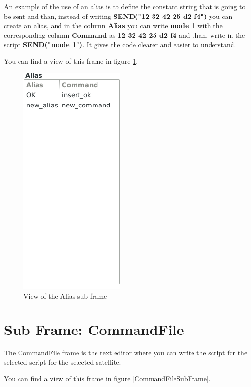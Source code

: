 \documentclass[pdftex,11pt,a4paper,titlepage]{report}
\begin{document}
An example of the use of an alias is to define the constant string that is going to be sent and than, instead of writing \textbf{SEND("12 32 42 25 d2 f4")} you can create an alias, and in the column \textbf{Alias} you can write \textbf{mode 1} with the corresponding column \textbf{Command} as \textbf{12 32 42 25 d2 f4} and than, write in the script \textbf{SEND("mode 1")}. It gives the code clearer and easier to understand. 

You can find a view of this frame in figure \ref{AliasSubFrame}.
\begin{figure}[h]
\centering
\includegraphics[scale=0.6]{../images/AliasSubFrame.png}
\caption{View of the Alias sub frame}
\label{AliasSubFrame}
\end{figure}

\section{Sub Frame: CommandFile}
\hspace{0.4cm} The CommandFile frame is the text editor where you can write the script for the selected script for the selected satellite. 

You can find a view of this frame in figure \ref{CommandFileSubFrame}.
\end{document}
